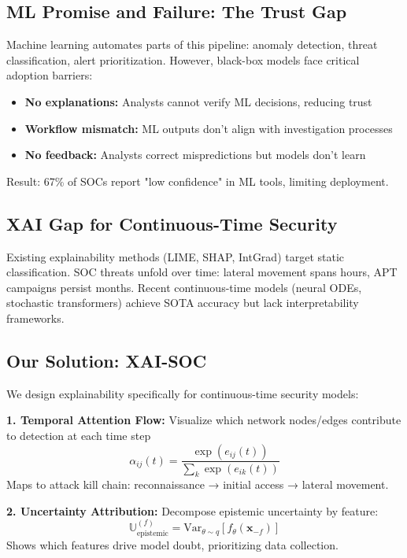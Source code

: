 \documentclass[letterpaper,twocolumn,10pt]{article}
\begin{document}
\subsection{ML Promise and Failure: The Trust Gap}
Machine learning automates parts of this pipeline: anomaly detection, threat classification, alert prioritization. However, black-box models face critical adoption barriers:
\begin{itemize}
\item \textbf{No explanations:} Analysts cannot verify ML decisions, reducing trust
\item \textbf{Workflow mismatch:} ML outputs don't align with investigation processes
\item \textbf{No feedback:} Analysts correct mispredictions but models don't learn
\end{itemize}
Result: 67\% of SOCs report "low confidence" in ML tools, limiting deployment.

\subsection{XAI Gap for Continuous-Time Security}
Existing explainability methods (LIME, SHAP, IntGrad) target static classification. SOC threats unfold over time: lateral movement spans hours, APT campaigns persist months. Recent continuous-time models (neural ODEs, stochastic transformers) achieve SOTA accuracy but lack interpretability frameworks.

\subsection{Our Solution: XAI-SOC}
We design explainability specifically for continuous-time security models:

\textbf{1. Temporal Attention Flow:} Visualize which network nodes/edges contribute to detection at each time step
\begin{equation}
\alpha_{ij}(t) = \frac{\exp(e_{ij}(t))}{\sum_k \exp(e_{ik}(t))}
\end{equation}
Maps to attack kill chain: reconnaissance → initial access → lateral movement.

\textbf{2. Uncertainty Attribution:} Decompose epistemic uncertainty by feature:
\begin{equation}
\mathbb{U}_{\text{epistemic}}^{(f)} = \text{Var}_{\theta \sim q}[f_\theta(\mathbf{x}_{-f})]
\end{equation}
Shows which features drive model doubt, prioritizing data collection.
\end{document}
